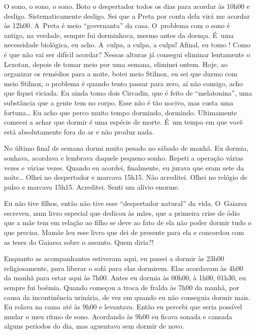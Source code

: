 O sono, o sono, o sono. Boto o despertador todos os dias para acordar às
10h00 e desligo. Sistematicamente desligo. Sei que a Preta por conta
dela virá me acordar às 12h00. A~Preta é meio ``governanta'' da casa. O~problema com o sono é antigo, na verdade, sempre fui dorminhoca, mesmo
antes da doença. É~uma necessidade biológica, eu acho. A~culpa, a culpa,
a culpa! Afinal, eu tomo     ! Como é
que não vai ser difícil acordar? Nessas alturas já consegui eliminar
lentamente o Lexotan, depois de tomar meio por uma semana, eliminei
ontem. Hoje, ao organizar os remédios para a noite, botei meio Stilnox,
eu sei que durmo com meio Stilnox, o problema é quando tento passar para
zero, aí não consigo, acho que fiquei viciada. Eu ainda tomo dois
Circadin, que é feito de ``melatonina'', uma substância que a gente tem
no corpo. Esse não é tão nocivo, mas custa uma fortuna… Eu acho
que perco muito tempo dormindo, dormindo. Ultimamente comecei a achar
que dormir é uma espécie de morte. É~um tempo em que você está
absolutamente fora do ar e não produz nada.

No último final de semana dormi muito pesado no sábado de manhã. Eu
dormia, sonhava, acordava e lembrava daquele pequeno sonho. Repeti a
operação várias vezes e várias vezes. Quando eu acordei, finalmente, eu
jurava que eram sete da noite… Olhei no despertador e marcava
15h15. Não acreditei. Olhei no relógio de pulso e marcava 15h15.
Acreditei. Senti um alívio enorme.

Eu não tive filhos, então não tive esse ``despertador natural'' da vida.
O~Gaiarsa escreveu, num livro especial que dedicou às mães, que a
primeira crise de ódio que a mãe tem em relação ao filho se deve ao fato
de ela não poder dormir tudo o que precisa. Mamãe leu esse livro que dei
de presente para ela e concordou com as teses do Gaiarsa sobre o
assunto. Quem diria?!

Enquanto as acompanhantes estiveram aqui, eu passei a dormir às 23h00
religiosamente, para liberar o sofá para elas dormirem. Elas acordavam
às 4h00 da manhã para estar aqui às 7h00. Antes eu dormia às 00h00, à
1h00, 01h30, eu sempre fui boêmia. Quando começou a troca de fralda às
7h00 da manhã, por causa da incontinência urinária, de vez em quando eu
não conseguia dormir mais. Eu rolava na cama até às 9h00 e levantava.
Então eu percebi que seria possível mudar o meu ritmo de sono. Acordando
às 9h00 eu ficava sonada e cansada alguns períodos do dia, mas aguentava
sem dormir de novo.

